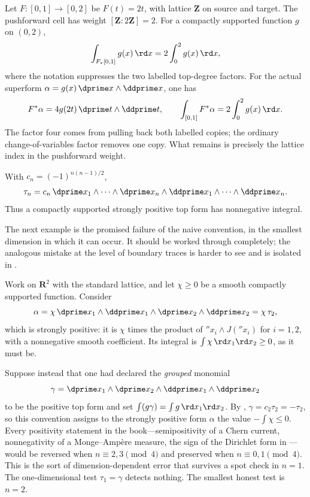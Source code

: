 \begin{example}
\label{ex:ch11-nonunimodular}
Let $F:[0,1]\to[0,2]$ be $F(t)=2t$, with lattice $\mathbf Z$ on source and
target.  The pushforward cell has weight
$[\mathbf Z:2\mathbf Z]=2$.  For a compactly supported function $g$ on
$(0,2)$,
\[
 \int_{F_*[0,1]} g(x)\,\rd x
 =2\int_0^2g(x)\,\rd x,
\]
where the notation suppresses the two labelled top-degree factors.  For the
actual superform
$\alpha=g(x)\,\dprime x\wedge\ddprime x$, one has
\[
 F^*\alpha=4g(2t)\,\dprime t\wedge\ddprime t,
 \qquad
 \int_{[0,1]}F^*\alpha
 =2\int_0^2g(x)\,\rd x.
\]
The factor four comes from pulling back both labelled copies; the ordinary
change-of-variables factor removes one copy.  What remains is precisely the
lattice index in the pushforward weight.
\end{example}

\begin{example}
\label{ex:ch11-positivity-sign}
With $c_n=(-1)^{n(n-1)/2}$,
\[
\tau_n=c_n\,\dprime x_1\wedge\cdots\wedge \dprime x_n\wedge
 \ddprime x_1\wedge\cdots\wedge \ddprime x_n.
\]
Thus a compactly supported strongly positive top form has nonnegative
integral.
\end{example}

The next example is the promised failure of the naive convention, in the
smallest dimension in which it can occur.  It should be worked through
completely; the analogous mistake at the level of boundary traces is
harder to see and is isolated in .

\begin{example}
\label{ex:ch11-grouped-wrong-sign}
Work on $\mathbf R^2$ with the standard lattice, and let
$\chi\ge0$ be a smooth compactly supported function.  Consider
\[
 \alpha=\chi\,\dprime x_1\wedge\ddprime x_1
       \wedge\dprime x_2\wedge\ddprime x_2
      =\chi\,\tau_2 ,
\]
which is strongly positive: it is
$\chi$ times the product of
$\dprime x_i\wedge J(\dprime x_i)$ for $i=1,2$, with a nonnegative smooth
coefficient.  Its integral is
$\int\chi\,\rd x_1\rd x_2\ge0$, as it must be.

Suppose instead that one had declared the \emph{grouped} monomial
\[
 \gamma=\dprime x_1\wedge\dprime x_2
       \wedge\ddprime x_1\wedge\ddprime x_2
\]
to be the positive top form and set
$\int(g\gamma)=\int g\,\rd x_1\rd x_2$.  By
, $\gamma=c_2\tau_2=-\tau_2$, so this
convention assigns to the strongly positive form $\alpha$ the value
$-\int\chi\le0$.  Every positivity statement in the book---semipositivity of
a Chern current, nonnegativity of a Monge--Amp\`ere measure, the sign of the
Dirichlet form in ---would be reversed when
$n\equiv2,3\pmod4$ and preserved when $n\equiv0,1\pmod4$.  This is the sort of
dimension-dependent error that survives a spot check in $n=1$.  The
one-dimensional test $\tau_1=\gamma$ detects nothing.  The smallest honest
test is $n=2$.
\end{example}

